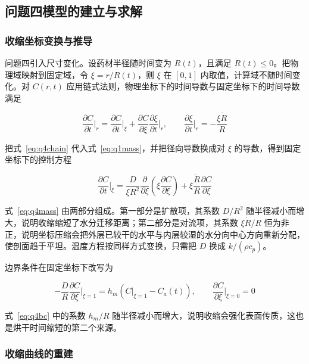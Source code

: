 \documentclass[12pt,a4paper]{article}
\begin{document}
\subsection{问题四模型的建立与求解}

\subsubsection{收缩坐标变换与推导}

问题四引入尺寸变化。设药材半径随时间变为 $R(t)$，且满足 $\dot R(t)\le 0$。把物理域映射到固定域，令 $\xi=r/R(t)$，则 $\xi$ 在 $[0,1]$ 内取值，计算域不随时间变化。对 $C(r,t)$ 应用链式法则，物理坐标下的时间导数与固定坐标下的时间导数满足

\begin{equation}
\frac{\partial C}{\partial t}\bigg|_{r}=\frac{\partial C}{\partial t}\bigg|_{\xi}+\frac{\partial C}{\partial \xi}\frac{\partial \xi}{\partial t}\bigg|_{r},\qquad
\frac{\partial \xi}{\partial t}\bigg|_{r}=-\frac{\xi \dot R}{R}
\label{eq:q4chain}
\end{equation}

把式~\eqref{eq:q4chain} 代入式~\eqref{eq:q1mass}，并把径向导数换成对 $\xi$ 的导数，得到固定坐标下的控制方程

\begin{equation}
\frac{\partial C}{\partial t}\bigg|_{\xi}=\frac{D}{\xi R^{2}}\frac{\partial}{\partial \xi}\left(\xi\frac{\partial C}{\partial \xi}\right)+\xi\frac{\dot R}{R}\frac{\partial C}{\partial \xi}
\label{eq:q4mass}
\end{equation}

式~\eqref{eq:q4mass} 由两部分组成。第一部分是扩散项，其系数 $D/R^2$ 随半径减小而增大，说明收缩缩短了水分迁移距离；第二部分是对流项，其系数 $\xi \dot R/R$ 恒为非正，说明坐标压缩会把外层已较干的水平与内层较湿的水分向中心方向重新分配，使剖面趋于平坦。温度方程按同样方式变换，只需把 $D$ 换成 $k/(\rho c_p)$。

边界条件在固定坐标下改写为

\begin{equation}
-\frac{D}{R}\frac{\partial C}{\partial \xi}\bigg|_{\xi=1}=h_m\left(C\big|_{\xi=1}-C_a(t)\right),\qquad
\frac{\partial C}{\partial \xi}\bigg|_{\xi=0}=0
\label{eq:q4bc}
\end{equation}

式~\eqref{eq:q4bc} 中的系数 $h_m/R$ 随半径减小而增大，说明收缩会强化表面传质，这也是烘干时间缩短的第二个来源。

\subsubsection{收缩曲线的重建}
\end{document}
